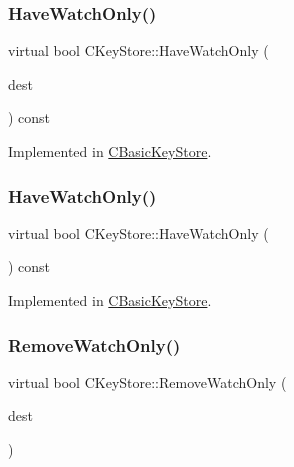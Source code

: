 \subsubsection{\texorpdfstring{Have\+Watch\+Only()}{HaveWatchOnly()}\hspace{0.1cm}{\footnotesize\ttfamily [1/2]}}
{\footnotesize\ttfamily virtual bool C\+Key\+Store\+::\+Have\+Watch\+Only (\begin{DoxyParamCaption}\item[{const C\+Script \&}]{dest }\end{DoxyParamCaption}) const\hspace{0.3cm}{\ttfamily [pure virtual]}}



Implemented in \mbox{\hyperlink{class_c_basic_key_store_a3ce143be2a1d3e752972614cf7fb7efb}{C\+Basic\+Key\+Store}}.

\mbox{\label{class_c_key_store_a9169351f4acf62d299afb824174cbfa8}} 
\subsubsection{\texorpdfstring{Have\+Watch\+Only()}{HaveWatchOnly()}\hspace{0.1cm}{\footnotesize\ttfamily [2/2]}}
{\footnotesize\ttfamily virtual bool C\+Key\+Store\+::\+Have\+Watch\+Only (\begin{DoxyParamCaption}{ }\end{DoxyParamCaption}) const\hspace{0.3cm}{\ttfamily [pure virtual]}}



Implemented in \mbox{\hyperlink{class_c_basic_key_store_aa6686d4477a180096436e7d491142f10}{C\+Basic\+Key\+Store}}.

\mbox{\label{class_c_key_store_ad510747f28d129123a5200e4df8f7f61}} 
\subsubsection{\texorpdfstring{Remove\+Watch\+Only()}{RemoveWatchOnly()}}
{\footnotesize\ttfamily virtual bool C\+Key\+Store\+::\+Remove\+Watch\+Only (\begin{DoxyParamCaption}\item[{const C\+Script \&}]{dest }\end{DoxyParamCaption})\hspace{0.3cm}{\ttfamily [pure virtual]}}



